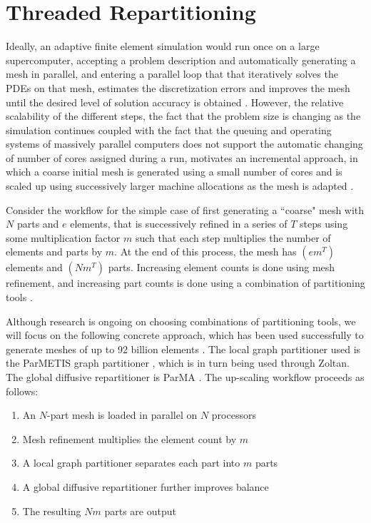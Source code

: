 \documentclass[final,1p,times]{elsarticle}
\begin{document}
\section{Threaded Repartitioning}
\label{sec:repart}

Ideally, an adaptive finite element simulation would run once on a large supercomputer,
accepting a problem description and automatically generating a mesh in parallel, 
and entering a parallel loop that that iteratively solves the PDEs on that mesh, estimates the
discretization errors and improves the mesh until the desired level
of solution accuracy is obtained \cite{Gal10,rasquin2014scalable,Zhou-flow}.
However, the relative scalability of the different steps, the fact that the problem size is 
changing as the simulation continues coupled with the fact that the queuing and operating 
systems of massively parallel computers does not support the automatic changing of number
of cores assigned during a run, motivates an incremental approach, in which
a coarse initial mesh is generated using a small number of cores and is scaled
up using successively larger machine allocations as the mesh is adapted \cite{rasquin2014scalable}.

Consider the workflow for the simple case of first generating a ``coarse" mesh
with $N$ parts and $e$ elements,
that is successively refined in a series of $T$ steps using some multiplication factor $m$
such that each step multiplies the number of elements and parts by $m$.
At the end of this process, the mesh has $(em^T)$ elements and $(Nm^T)$ parts.
Increasing element counts is done using mesh refinement, and 
increasing part counts is done using a combination of partitioning tools \cite{rasquin2014scalable}.

Although research is ongoing on choosing combinations of partitioning tools, we
will focus on the following concrete approach, which has been used
successfully to generate meshes of up to 92 billion elements
\cite{rasquin2014scalable,zhou2012unstructured}.
The local graph partitioner used is
the ParMETIS graph partitioner \cite{karypis2011metis},
which is in turn being used through Zoltan\cite{devine2002zoltan}.
The global diffusive repartitioner is ParMA \cite{rasquin2014scalable,zhou2012unstructured}.
The up-scaling workflow proceeds as follows:

\begin{enumerate}
\item An $N$-part mesh is loaded in parallel on $N$ processors
\item Mesh refinement multiplies the element count by $m$
\item A local graph partitioner separates each part into $m$ parts
\item A global diffusive repartitioner further improves balance
\item The resulting $Nm$ parts are output
\end{enumerate}
\end{document}
